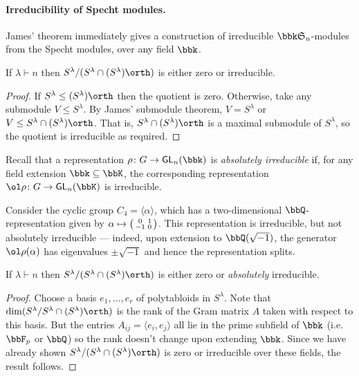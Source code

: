 \paragraph{Irreducibility of Specht modules.} James' theorem
immediately gives a construction of irreducible $\bbk\sym n$-modules from the
Specht modules, over any field $\bbk$.

\begin{corollary}
    If $\lambda \vdash n$ then $S^\lambda/(S^\lambda \cap (S^\lambda) \orth)$ is
    either zero or irreducible.

    \begin{proof}
        If $S^\lambda\leq (S^\lambda)\orth$ then the quotient is zero.
        Otherwise, take any submodule $V\leq S^\lambda$. By James' submodule theorem,
        $V=S^\lambda$ or $V\leq S^\lambda \cap (S^\lambda)\orth$. That is,
        $S^\lambda\cap (S^\lambda)\orth$ is a maximal submodule of $S^\lambda$,
        so the quotient is irreducible as required.
    \end{proof}
\end{corollary}

Recall that a representation $\rho\colon G\to \mathsf{GL}_n(\bbk)$ is \emph{absolutely irreducible} if, for any field extension $\bbk\subseteq \bbK$, the corresponding representation $\ol\rho\colon G\to \mathsf{GL}_n(\bbK)$ is irreducible.

\begin{example} 
    Consider the cyclic group $C_4=\langle \alpha \rangle$, which has a two-dimensional
    $\bbQ$-representation given by $\alpha \mapsto \left(\begin{smallmatrix} 0&1 \\ -1 &
    0 \end{smallmatrix}\right)$. This representation is irreducible, but not absolutely irreducible ---
    indeed, upon extension to $\bbQ(\sqrt{-1})$, the generator $\ol\rho(\alpha)$
    has eigenvalues $\pm \sqrt{-1}$ and hence the representation splits.
\end{example}

\begin{proposition}
    If $\lambda \vdash n$ then $S^\lambda/(S^\lambda \cap (S^\lambda) \orth)$ is
    either zero or \emph{absolutely} irreducible.

    \begin{proof}
        Choose a basis $e_1,\ldots,e_r$ of polytabloids in $S^\lambda$. Note that
        $\dim(S^\lambda/S^\lambda\cap (S^\lambda)\orth)$ is the rank of the Gram
        matrix $A$ taken with respect to this basis. But the entries
        $A_{ij}=\langle e_i, e_j\rangle$ all lie in the prime subfield of $\bbk$
        (i.e.\ $\bbF_p$ or $\bbQ$) so the rank doesn't change upon
        extending $\bbk$. Since we have already shown $S^\lambda/(S^\lambda\cap
        (S^\lambda)\orth)$ is zero or irreducible over these fields, the result follows.
    \end{proof}
\end{proposition}

